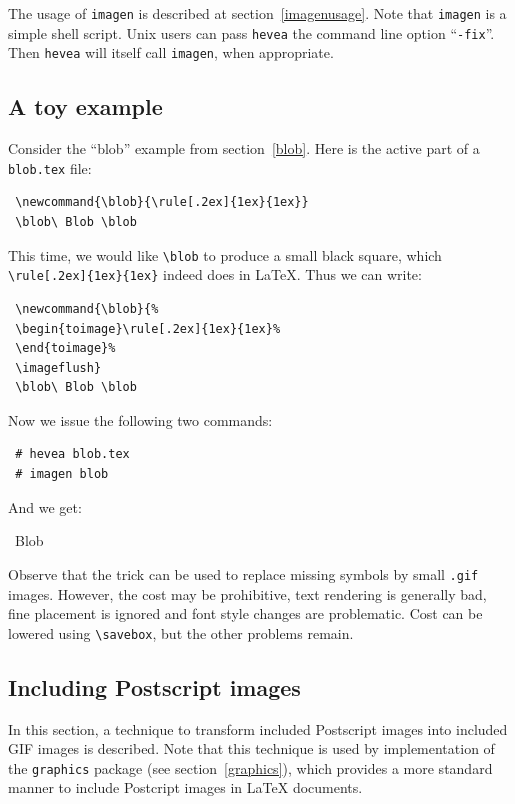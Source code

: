 The  usage of \verb+imagen+  is described at
section~\ref{imagenusage}. Note that \texttt{imagen} is a simple shell
script. Unix users can pass \texttt{hevea} the command line option
``\texttt{-fix}''. Then \texttt{hevea} will
itself call \texttt{imagen}, when appropriate.





\subsection{A toy example}
Consider the ``blob'' example from section~\ref{blob}.
Here is the active part of a \texttt{blob.tex} file:
\begin{verbatim}
 \newcommand{\blob}{\rule[.2ex]{1ex}{1ex}}
 \blob\ Blob \blob
\end{verbatim}
This time, we would like \verb+\blob+ to produce a small black square, which
\verb+\rule[.2ex]{1ex}{1ex}+ indeed does in \LaTeX{}.
Thus we can write:
\begin{verbatim}
 \newcommand{\blob}{%
 \begin{toimage}\rule[.2ex]{1ex}{1ex}%
 \end{toimage}%
 \imageflush}
 \blob\ Blob \blob
\end{verbatim}
Now we issue the following two commands:
\begin{verbatim}
 # hevea blob.tex
 # imagen blob
\end{verbatim}
And we get:
\begin{htmlout}
\begin{htmlonly}
\newcommand{\blob}{%
\begin{toimage}\rule[.2ex]{1ex}{1ex}%
\end{toimage}%
\imageflush}\newsavebox{\blobbox}\sbox{\blobbox}{\blob}
\usebox{\blobbox}\ Blob \usebox{\blobbox}
\end{htmlonly}
\begin{latexonly}\vspace*{.5ex}
\end{latexonly}%
\end{htmlout}

Observe that the trick can be used to replace missing symbols by small
\texttt{.gif} images. However, the cost may be prohibitive, text rendering
is generally bad, fine placement is ignored and font style changes are
problematic.
Cost can be lowered using \verb+\savebox+, but the other problems remain.


\subsection{Including Postscript images}\label{substimage}
In this section, a technique to transform included Postscript images
into included GIF images is described.
Note that this technique is used by \hevea{} implementation of the
\texttt{graphics} package (see section~\ref{graphics}),
which provides a more standard manner to include Postcript images in
\LaTeX{} documents.

